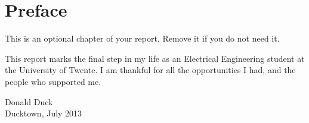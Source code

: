 \chapter*{Preface}

\vskip-10pt
This is an optional chapter of your report. Remove it if you do not need it.

This report marks the final step in my life as an Electrical Engineering
 student at the University of Twente. 
 I am thankful for all the opportunities I had, and the people who supported
 me.

\vskip50pt
Donald Duck\\
Ducktown, July 2013